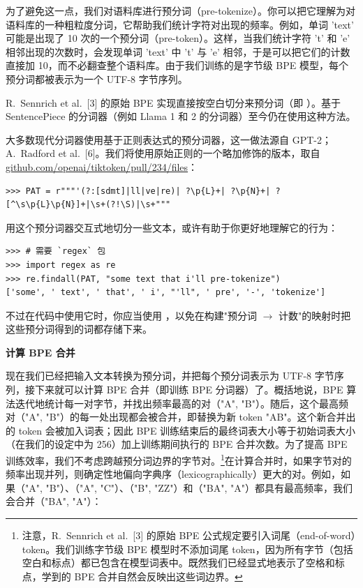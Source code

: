 为了避免这一点，我们对语料库进行预分词（pre-tokenize）。你可以把它理解为对语料库的一种粗粒度分词，它帮助我们统计字符对出现的频率。例如，单词 'text' 可能是出现了 10 次的一个预分词（pre-token）。这样，当我们统计字符 't' 和 'e' 相邻出现的次数时，会发现单词 'text' 中 't' 与 'e' 相邻，于是可以把它们的计数直接加 10，而不必翻查整个语料库。由于我们训练的是字节级 BPE 模型，每个预分词都被表示为一个 UTF-8 字节序列。

R.~Sennrich et al.~[3] 的原始 BPE 实现直接按空白切分来预分词（即 ）。基于 SentencePiece 的分词器（例如 Llama 1 和 2 的分词器）至今仍在使用这种方法。

大多数现代分词器使用基于正则表达式的预分词器，这一做法源自 GPT-2；A.~Radford et al.~[6]。我们将使用原始正则的一个略加修饰的版本，取自
\url{github.com/openai/tiktoken/pull/234/files}：

\begin{lstlisting}
>>> PAT = r"""'(?:[sdmt]|ll|ve|re)| ?\p{L}+| ?\p{N}+| ?[^\s\p{L}\p{N}]+|\s+(?!\S)|\s+"""
\end{lstlisting}

用这个预分词器交互式地切分一些文本，或许有助于你更好地理解它的行为：

\begin{lstlisting}
>>> # 需要 `regex` 包
>>> import regex as re
>>> re.findall(PAT, "some text that i'll pre-tokenize")
['some', ' text', ' that', ' i', "'ll", ' pre', '-', 'tokenize']
\end{lstlisting}

不过在代码中使用它时，你应当使用 ，以免在构建"预分词 $\to$ 计数"的映射时把这些预分词得到的词都存储下来。

\textbf{计算 BPE 合并}

现在我们已经把输入文本转换为预分词，并把每个预分词表示为 UTF-8 字节序列，接下来就可以计算 BPE 合并（即训练 BPE 分词器）了。概括地说，BPE 算法迭代地统计每一对字节，并找出频率最高的对（"A", "B"）。随后，这个最高频对（"A", "B"）的每一处出现都会被合并，即替换为新 token "AB"。这个新合并出的 token 会被加入词表；因此 BPE 训练结束后的最终词表大小等于初始词表大小（在我们的设定中为 256）加上训练期间执行的 BPE 合并次数。为了提高 BPE 训练效率，我们不考虑跨越预分词边界的字节对。\footnote{注意，R.~Sennrich et al.~[3] 的原始 BPE 公式规定要引入词尾（end-of-word）token。我们训练字节级 BPE 模型时不添加词尾 token，因为所有字节（包括空白和标点）都已包含在模型词表中。既然我们已经显式地表示了空格和标点，学到的 BPE 合并自然会反映出这些词边界。}在计算合并时，如果字节对的频率出现并列，则确定性地偏向字典序（lexicographically）更大的对。例如，如果（"A", "B"）、（"A", "C"）、（"B", "ZZ"）和（"BA", "A"）都具有最高频率，我们会合并（"BA", "A"）：

